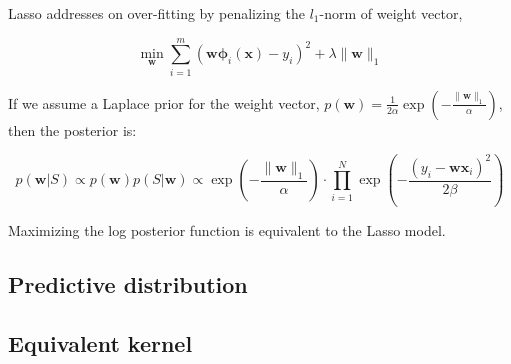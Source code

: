 \documentclass{article}
\begin{document}
	Lasso addresses on over-fitting by penalizing the $l_1$-norm of weight vector,
		
	\begin{equation*}
	\min_\mathbf{w} \sum_{i=1}^m (\mathbf{w\phi}_i(\mathbf{x}) - y_i)^2 + \lambda\|\mathbf{w}\|_1
	\end{equation*}
	
	If we assume a Laplace prior for the weight vector, $p(\mathbf{w})=\frac{1}{2\alpha} \exp \left( -\frac{\|\mathbf{w}\|_1}{\alpha} \right)$, then the posterior is:
	
	\begin{equation}
	p(\mathbf{w}|S) \propto p(\mathbf{w}) p(S|\mathbf{w}) \propto \exp \left( -\frac{\|\mathbf{w}\|_1}{\alpha} \right) \cdot \prod_{i=1}^N \exp \left( -\frac{(y_i-\mathbf{wx}_i)^2}{2\beta} \right)
	\end{equation}

Maximizing the log posterior function is equivalent to the Lasso model.

	
	
	\subsection{Predictive distribution}
	
	\subsection{Equivalent kernel}
\end{document}
